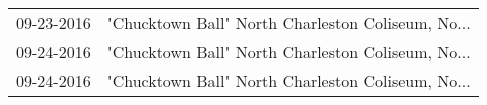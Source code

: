 \begin{supertabular}{ll}
 09-23-2016 &  "Chucktown Ball" North Charleston Coliseum, No... \\
 09-24-2016 &  "Chucktown Ball" North Charleston Coliseum, No... \\
 09-24-2016 &  "Chucktown Ball" North Charleston Coliseum, No... \\
\end{supertabular}
